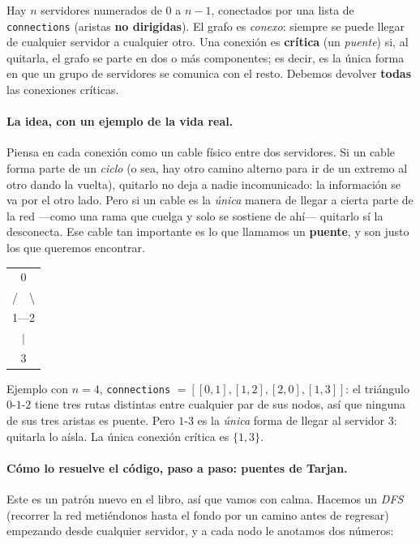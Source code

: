 
Hay $n$ servidores numerados de $0$ a $n-1$, conectados por una lista de
\texttt{connections} (aristas \textbf{no dirigidas}). El grafo es
\emph{conexo}: siempre se puede llegar de cualquier servidor a cualquier
otro. Una conexión es \textbf{crítica} (un \emph{puente}) si, al quitarla, el
grafo se parte en dos o más componentes; es decir, es la única forma en que
un grupo de servidores se comunica con el resto. Debemos devolver
\textbf{todas} las conexiones críticas.

\paragraph{La idea, con un ejemplo de la vida real.} Piensa en cada conexión
como un cable físico entre dos servidores. Si un cable forma parte de un
\emph{ciclo} (o sea, hay otro camino alterno para ir de un extremo al otro
dando la vuelta), quitarlo no deja a nadie incomunicado: la información se va
por el otro lado. Pero si un cable es la \emph{única} manera de llegar a
cierta parte de la red —como una rama que cuelga y solo se sostiene de ahí—
quitarlo sí la desconecta. Ese cable tan importante es lo que llamamos un
\textbf{puente}, y son justo los que queremos encontrar.

\begin{center}
\ttfamily
\begin{tabular}{c}
\phantom{x}0\phantom{x}\\
/\ \ \textbackslash\\
1---2\\
$|$\\
3
\end{tabular}
\end{center}

\noindent Ejemplo con $n=4$, \texttt{connections} $=
[[0,1],[1,2],[2,0],[1,3]]$: el triángulo $0$-$1$-$2$ tiene tres rutas
distintas entre cualquier par de sus nodos, así que ninguna de sus tres
aristas es puente. Pero $1$-$3$ es la \emph{única} forma de llegar al
servidor $3$: quitarla lo aísla. La única conexión crítica es
$\{1,3\}$.

\paragraph{Cómo lo resuelve el código, paso a paso: puentes de Tarjan.} Este
es un patrón nuevo en el libro, así que vamos con calma. Hacemos un \emph{DFS}
(recorrer la red metiéndonos hasta el fondo por un camino antes de regresar)
empezando desde cualquier servidor, y a cada nodo le anotamos dos números:


